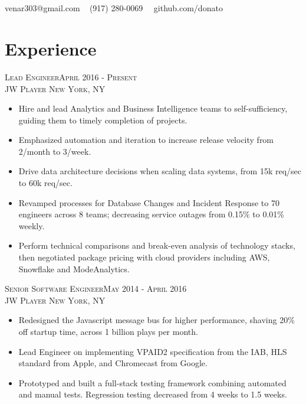 \documentclass[oneside, final]{scrartcl}
\begin{document}
\begin{center}
 
\textsc{\LARGE{}}\\
\\
{\Large\Letter} venar303@gmail.com \ {\Large\Telefon} (917) 280-0069 \ \faGithub \ github.com/donato

    \vspace{-5pt}


\section{Experience}
\textsc{Lead Engineer\hfill April 2016 - Present\\}
\textsc{JW Player \hfill New York, NY\\}
\begin{itemize}
	\setlength{\itemsep}{1pt}
	\setlength{\parskip}{0pt}
	\setlength{\parsep}{0pt}
	\setlength{\leftmargin}{-5mm}
	\item Hire and lead Analytics and Business Intelligence teams to self-sufficiency, guiding them to timely completion of projects.
	\item Emphasized automation and iteration to increase release velocity from 2/month to 3/week.
	\item Drive data architecture decisions when scaling data systems, from 15k req/sec to 60k req/sec.
	\item Revamped processes for Database Changes and Incident Response to 70 engineers across 8 teams; decreasing service outages from 0.15\% to 0.01\% weekly.
	\item Perform technical comparisons and break-even analysis of technology stacks, then negotiated package pricing with cloud providers including AWS, Snowflake and ModeAnalytics.
\end{itemize}

\textsc{Senior Software Engineer\hfill May 2014 - April 2016\\}
\textsc{JW Player \hfill New York, NY\\}
\begin{itemize}
	\setlength{\itemsep}{1pt}
	\setlength{\itemsep}{1pt}
	\setlength{\parskip}{0pt}
	\setlength{\parsep}{0pt}
	\setlength{\leftmargin}{-5mm}
        \item Redesigned the Javascript message bus for higher performance, shaving 20\% off startup time, across 1 billion plays per month.
        \item Lead Engineer on implementing VPAID2 specification from the IAB, HLS standard from Apple, and Chromecast from Google.
        \item Prototyped and built a full-stack testing framework combining automated and manual tests. Regression testing decreased from 4 weeks to 1.5 weeks.
\end{itemize}


\end{center}
\end{document}
